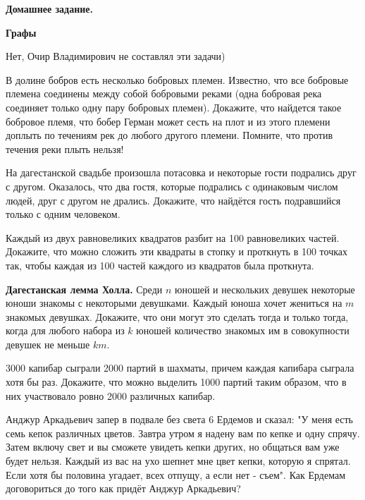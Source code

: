 \centerline{\bf \Huge Домашнее задание.}
\centerline{\bf \Huge Графы}

\begin{flushright}
        \scriptsize{Нет, Очир Владимирович не составлял эти задачи)}
\end{flushright}

В долине бобров есть несколько бобровых племен. Известно, что все бобровые племена соединены между собой бобровыми реками (одна бобровая река соединяет только одну пару 
бобровых племен). Докажите, что найдется такое бобровое племя, что бобер Герман может сесть на плот и из этого племени доплыть по течениям рек до любого другого племени. Помните, что против течения реки плыть нельзя!

На дагестанской свадьбе произошла потасовка и некоторые гости подрались друг с другом. Оказалось, что два гостя, которые подрались с одинаковым числом людей, друг с другом не дрались. Докажите, что найдётся гость подравшийся только с одним человеком.

Каждый из двух равновеликих квадратов разбит на 100 равновеликих частей. Докажите, что можно сложить эти квадраты в стопку и проткнуть в 100 точках так, чтобы каждая из 100 частей каждого из квадратов была проткнута.

\textbf{Дагестанская лемма Холла.} Среди $n$ юношей и нескольких девушек некоторые юноши знакомы с некоторыми девушками. Каждый юноша хочет жениться на $m$   знакомых девушках. Докажите, что они могут это сделать тогда и только тогда, когда для любого набора из $k$  юношей количество знакомых им в совокупности девушек не меньше $km$.

3000 капибар сыграли 2000 партий в шахматы, причем каждая капибара сыграла хотя бы раз. Докажите, что можно выделить 1000 партий таким образом, что в них участвовало ровно 2000 различных капибар.

Анджур Аркадьевич запер в подвале без света 6 Ердемов и сказал: "У меня есть семь кепок различных цветов. Завтра утром я надену вам по кепке и одну спрячу. Затем включу свет и вы сможете увидеть кепки других, но общаться вам уже будет нельзя. Каждый из вас на ухо шепнет мне цвет кепки, которую я спрятал. Если хотя бы половина угадает, всех отпущу, а если нет - съем". Как Ердемам договориться до того как придёт Анджур Аркадьевич?
